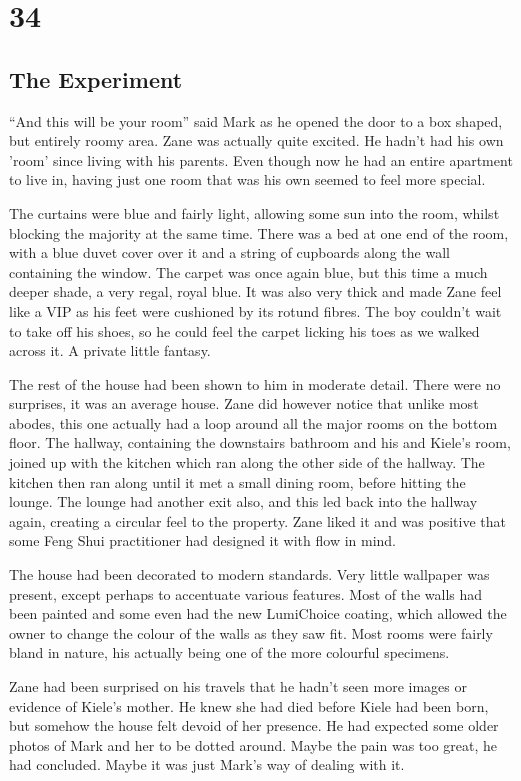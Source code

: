 \chapter{34}
\section{The Experiment}


``And this will be your room'' said Mark as he opened the door to a box shaped, but entirely roomy area.  Zane was actually quite excited.  He hadn't had his own 'room' since living with his parents.  Even though now he had an entire apartment to live in, having just one room that was his own seemed to feel more special.  

The curtains were blue and fairly light, allowing some sun into the room, whilst blocking the majority at the same time.  There was a bed at one end of the room, with a blue duvet cover over it and a string of cupboards along the wall containing the window.  The carpet was once again blue, but this time a much deeper shade, a very regal, royal blue.  It was also very thick and made Zane feel like a VIP as his feet were cushioned by its rotund fibres.  The boy couldn't wait to take off his shoes, so he could feel the carpet licking his toes as we walked across it.  A private little fantasy.

The rest of the house had been shown to him in moderate detail.  There were no surprises, it was an average house.  Zane did however notice that unlike most abodes, this one actually had a loop around all the major rooms on the bottom floor.  The hallway, containing the downstairs bathroom and his and Kiele's room, joined up with the kitchen which ran along the other side of the hallway.  The kitchen then ran along until it met a small dining room, before hitting the lounge.  The lounge had another exit also, and this led back into the hallway again, creating a circular feel to the property.  Zane liked it and was positive that some Feng Shui practitioner had designed it with flow in mind.

The house had been decorated to modern standards.  Very little wallpaper was present, except perhaps to accentuate various features.  Most of the walls had been painted and some even had the new LumiChoice coating, which allowed the owner to change the colour of the walls as they saw fit.  Most rooms were fairly bland in nature, his actually being one of the more colourful specimens.  

Zane had been surprised on his travels that he hadn't seen more images or evidence of Kiele's mother.  He knew she had died before Kiele had been born, but somehow the house felt devoid of her presence.  He had expected some older photos of Mark and her to be dotted around.  Maybe the pain was too great, he had concluded.  Maybe it was just Mark's way of dealing with it.


